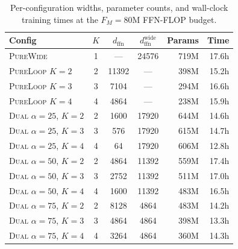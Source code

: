 \documentclass[11pt]{article}
\begin{document}
\begin{table}[h]
\centering
\small
\setlength{\tabcolsep}{4pt}
\renewcommand{\arraystretch}{1.05}
\begin{tabular}{lcccrr}
\toprule
Config & $K$ & $d_{\text{ffn}}$ & $d_{\text{ffn}}^{\text{wide}}$ & Params & Time \\
\midrule
\textsc{PureWide}                       & 1 & ---   & 24576 & 719M & 17.6h \\
\textsc{PureLoop} $K{=}2$               & 2 & 11392 & ---   & 398M & 15.2h \\
\textsc{PureLoop} $K{=}3$               & 3 &  7104 & ---   & 294M & 16.6h \\
\textsc{PureLoop} $K{=}4$               & 4 &  4864 & ---   & 238M & 15.9h \\
\midrule
\textsc{Dual} $\alpha{=}25$, $K{=}2$    & 2 &  1600 & 17920 & 644M & 14.6h \\
\textsc{Dual} $\alpha{=}25$, $K{=}3$    & 3 &   576 & 17920 & 615M & 14.7h \\
\textsc{Dual} $\alpha{=}25$, $K{=}4$    & 4 &    64 & 17920 & 606M & 12.8h \\
\textsc{Dual} $\alpha{=}50$, $K{=}2$    & 2 &  4864 & 11392 & 559M & 17.4h \\
\textsc{Dual} $\alpha{=}50$, $K{=}3$    & 3 &  2752 & 11392 & 511M & 17.0h \\
\textsc{Dual} $\alpha{=}50$, $K{=}4$    & 4 &  1600 & 11392 & 483M & 16.5h \\
\textsc{Dual} $\alpha{=}75$, $K{=}2$    & 2 &  8128 &  4864 & 483M & 14.2h \\
\textsc{Dual} $\alpha{=}75$, $K{=}3$    & 3 &  4864 &  4864 & 398M & 13.3h \\
\textsc{Dual} $\alpha{=}75$, $K{=}4$    & 4 &  3264 &  4864 & 360M & 14.3h \\
\bottomrule
\end{tabular}
\caption{Per-configuration widths, parameter counts, and
wall-clock training times at the $F_M = 80$M FFN-FLOP budget.}
\label{tab:configs-f80m}
\end{table}
\end{document}

